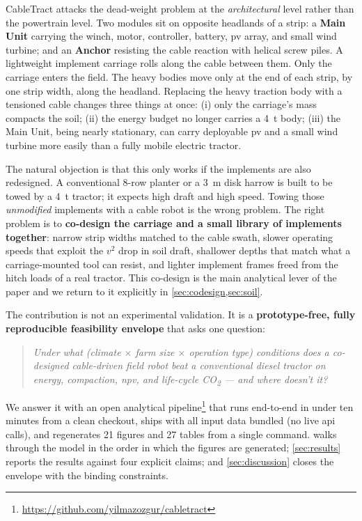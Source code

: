 \documentclass[11pt,a4paper]{article}
\newcommand{\cabletractrepo}{\url{https://github.com/yilmazozgur/cabletract}}
\begin{document}
CableTract attacks the dead-weight problem at the \emph{architectural} level rather than the powertrain level. Two modules sit on opposite headlands of a strip: a \textbf{Main Unit} carrying the winch, motor, controller, battery, \gls{pv} array, and small wind turbine; and an \textbf{Anchor} resisting the cable reaction with helical screw piles. A lightweight implement carriage rolls along the cable between them. Only the carriage enters the field. The heavy bodies move only at the end of each strip, by one strip width, along the headland. Replacing the heavy traction body with a tensioned cable changes three things at once: (i) only the carriage's mass compacts the soil; (ii) the energy budget no longer carries a \SI{4}{\tonne} body; (iii) the Main Unit, being nearly stationary, can carry deployable \gls{pv} and a small wind turbine more easily than a fully mobile electric tractor.

The natural objection is that this only works if the implements are also redesigned. A conventional 8-row planter or a \SI{3}{\meter} disk harrow is built to be towed by a \SI{4}{\tonne} tractor; it expects high draft and high speed. Towing those \emph{unmodified} implements with a cable robot is the wrong problem. The right problem is to \textbf{co-design the carriage and a small library of implements together}: narrow strip widths matched to the cable swath, slower operating speeds that exploit the $v^2$ drop in soil draft, shallower depths that match what a carriage-mounted tool can resist, and lighter implement frames freed from the hitch loads of a real tractor. This co-design is the main analytical lever of the paper and we return to it explicitly in \cref{sec:codesign,sec:soil}.

The contribution is not an experimental validation. It is a \textbf{prototype-free, fully reproducible feasibility envelope} that asks one question:

\begin{quote}
\itshape Under what (climate $\times$ farm size $\times$ operation type) conditions does a co-designed cable-driven field robot beat a conventional diesel tractor on energy, compaction, \gls{npv}, and life-cycle CO\textsubscript{2} --- and where doesn't it?
\end{quote}

We answer it with an open analytical pipeline\footnote{\cabletractrepo} that runs end-to-end in under ten minutes from a clean checkout, ships with all input data bundled (no live \gls{api} calls), and regenerates 21 figures and 27 tables from a single command.  walks through the model in the order in which the figures are generated; \cref{sec:results} reports the results against four explicit claims; and \cref{sec:discussion} closes the envelope with the binding constraints.
\end{document}
